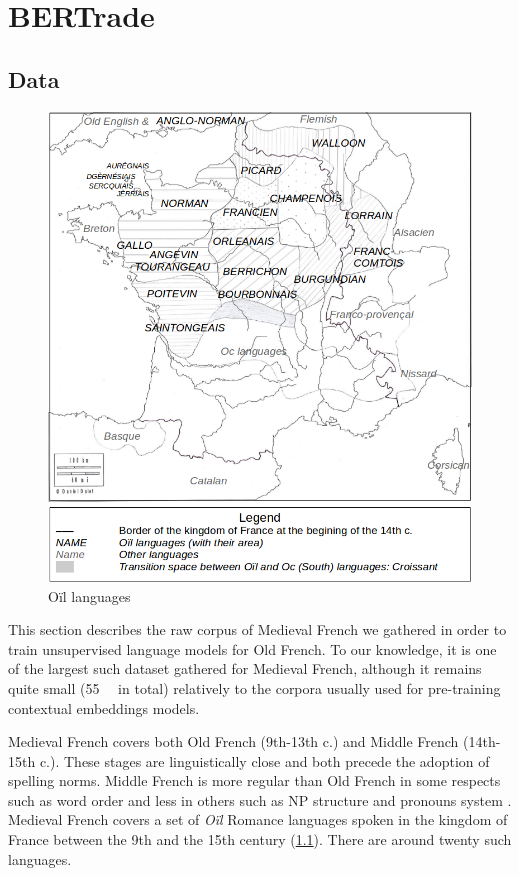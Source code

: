 \chapter{BERTrade}

\section{Data}\label{sec-data}

\begin{figure}[thb]
    \centering
    \includegraphics[scale=0.29]{static/media/mod_eval/bertrade/map-dialects2.png}
    \caption{Oïl languages}
    \label{fig:map-dialects}
\end{figure}

This section describes the raw corpus of Medieval French we gathered in order to train unsupervised language models for Old French.
To our knowledge, it is one of the largest such dataset gathered for Medieval French, although it remains quite small (\SI{55}{\mebi\byte} in total) relatively to the corpora usually used for pre-training contextual embeddings models.

Medieval French covers both Old French (9th-13th c.) and Middle French (14th-15th c.). These stages are linguistically close and both precede the adoption of spelling norms. Middle French is more regular than Old French in some respects such as word order \citep{marchello-Nizia-etal-2020-grande} and less in others such as NP structure and pronouns system \citep{marchello-nizia-etal-1979-histoire}. Medieval French covers a set of \textit{Oïl} Romance languages spoken in the kingdom of France between the 9th and the 15th century (\cref{fig:map-dialects}).
There are around twenty such languages.

